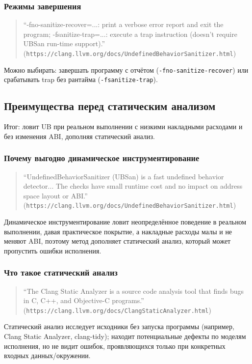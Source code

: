 \documentclass[a4paper,12pt]{article}
\begin{document}
\subsubsection{Режимы завершения}
\begin{quote}
``-fno-sanitize-recover=...: print a verbose error report and exit the program; -fsanitize-trap=...: execute a trap instruction (doesn’t require UBSan run-time support).'' (\texttt{https://clang.llvm.org/docs/UndefinedBehaviorSanitizer.html})
\end{quote}
Можно выбирать: завершать программу с отчётом (\texttt{-fno-sanitize-recover}) или срабатывать trap без рантайма (\texttt{-fsanitize-trap}).

\subsection{Преимущества перед статическим анализом}
Итог: ловит UB при реальном выполнении с низкими накладными расходами и без изменения ABI, дополняя статический анализ.
\subsubsection{Почему выгодно динамическое инструментирование}
\begin{quote}
``UndefinedBehaviorSanitizer (UBSan) is a fast undefined behavior detector... The checks have small runtime cost and no impact on address space layout or ABI.'' (\texttt{https://clang.llvm.org/docs/UndefinedBehaviorSanitizer.html})
\end{quote}
Динамическое инструментирование ловит неопределённое поведение в реальном выполнении, давая практическое покрытие, а накладные расходы малы и не меняют ABI, поэтому метод дополняет статический анализ, который может пропустить ошибки исполнения.
\subsubsection{Что такое статический анализ}
\begin{quote}
``The Clang Static Analyzer is a source code analysis tool that finds bugs in C, C++, and Objective-C programs.'' (\texttt{https://clang.llvm.org/docs/ClangStaticAnalyzer.html})
\end{quote}
Статический анализ исследует исходники без запуска программы (например, Clang Static Analyzer, clang-tidy); находит потенциальные дефекты по моделям исполнения, но не видит ошибок, проявляющихся только при конкретных входных данных/окружении.
\end{document}

